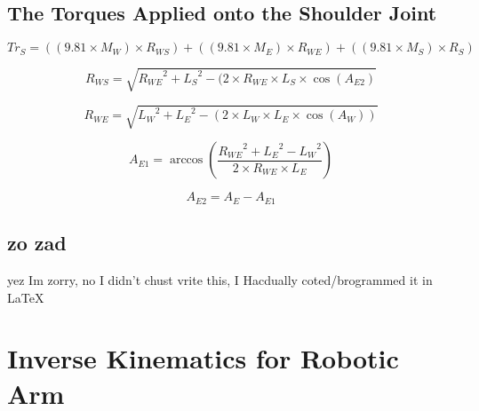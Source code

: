 \documentclass[12pt]{article}
\begin{document}
\subsection{The Torques Applied onto the Shoulder Joint}
\begin{equation}
Tr_S = ((9.81 \times {M_W}) \times {R_{WS}}) + ((9.81 \times M_E)\times R_{WE})+((9.81 \times M_S)\times R_S)
\end{equation}

\begin{equation}
R_{WS}=\sqrt{{R_{WE}}^2+{L_S}^2-(2 \times {R_{WE}} \times {L_S} \times \cos(A_{E 2})}
\end{equation}

\begin{equation}
R_{WE}=\sqrt{{L_W}^2+{L_E}^2-(2 \times {L_W} \times {L_E} \times \cos({A_W}))}
\end{equation}

\begin{equation}
A_{E 1}=\arccos(\frac{{R_{WE}}^2+{L_E}^2-{L_W}^2}{{2}\times{R_{WE}}\times{L_E}})
\end{equation}

\begin{equation}
A_{E 2} = {A_E} - {A_{E 1}}
\end{equation}

\subsection{zo zad}
yez Im zorry, no I didn't chust vrite this, I Hacdually coted/brogrammed it in LaTeX

\section{Inverse Kinematics for Robotic Arm}
\end{document}
